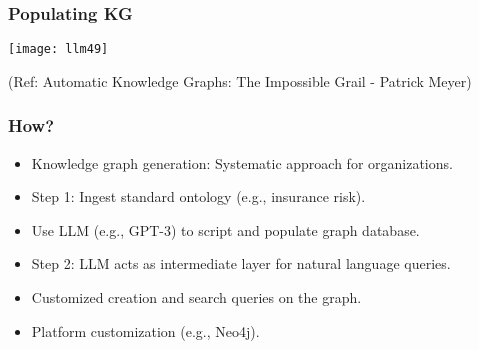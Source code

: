 \begin{frame}[fragile]\frametitle{Populating KG}

\begin{center}
\texttt{[image: llm49]}
\end{center}

{\tiny (Ref: Automatic Knowledge Graphs: The Impossible Grail - Patrick Meyer)}

\end{frame}





\begin{frame}[fragile]\frametitle{How?}

\begin{itemize}
\item Knowledge graph generation: Systematic approach for organizations.
\item Step 1: Ingest standard ontology (e.g., insurance risk).
\item Use LLM (e.g., GPT-3) to script and populate graph database.
\item Step 2: LLM acts as intermediate layer for natural language queries.
\item Customized creation and search queries on the graph.
\item Platform customization (e.g., Neo4j).
\end{itemize}
\end{frame}



